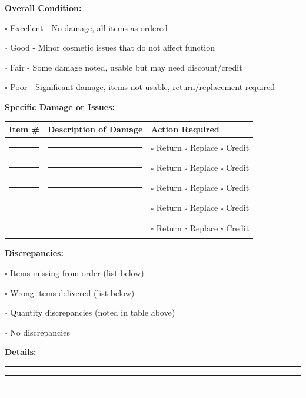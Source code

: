 \documentclass[11pt,letterpaper]{article}
\begin{document}
\textbf{Overall Condition:}

$\square$ Excellent - No damage, all items as ordered

$\square$ Good - Minor cosmetic issues that do not affect function

$\square$ Fair - Some damage noted, usable but may need discount/credit

$\square$ Poor - Significant damage, items not usable, return/replacement required

\vspace{6pt}

\textbf{Specific Damage or Issues:}

\begin{tabular}{|p{0.5in}|p{2.5in}|p{2.5in}|}
\hline
\textbf{Item \#} & \textbf{Description of Damage} & \textbf{Action Required} \\
\hline
\rule{0.3in}{0.4pt} & \rule{2.3in}{0.4pt} & $\square$ Return $\square$ Replace $\square$ Credit \\
\hline
\rule{0.3in}{0.4pt} & \rule{2.3in}{0.4pt} & $\square$ Return $\square$ Replace $\square$ Credit \\
\hline
\rule{0.3in}{0.4pt} & \rule{2.3in}{0.4pt} & $\square$ Return $\square$ Replace $\square$ Credit \\
\hline
\rule{0.3in}{0.4pt} & \rule{2.3in}{0.4pt} & $\square$ Return $\square$ Replace $\square$ Credit \\
\hline
\rule{0.3in}{0.4pt} & \rule{2.3in}{0.4pt} & $\square$ Return $\square$ Replace $\square$ Credit \\
\hline
\end{tabular}

\vspace{6pt}

\textbf{Discrepancies:}

$\square$ Items missing from order (list below)

$\square$ Wrong items delivered (list below)

$\square$ Quantity discrepancies (noted in table above)

$\square$ No discrepancies

\textbf{Details:}

\rule{14cm}{0.4pt}

\rule{14cm}{0.4pt}

\rule{14cm}{0.4pt}

\rule{14cm}{0.4pt}

\vspace{6pt}
\end{document}
